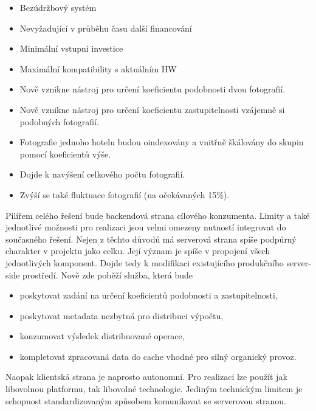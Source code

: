 \begin{itemize}
	\setlength{\parskip}{0pt}
	\setlength{\itemsep}{0pt}
	\item {Bezúdržbový systém}
	\item {Nevyžadující v průběhu času další financování}
	\item {Minimální vstupní investice}
	\item {Maximální kompatibility s aktuálním HW}
\end{itemize}

\begin{itemize}
	\setlength{\parskip}{0pt}
	\setlength{\itemsep}{0pt}
	\item {Nově vznikne nástroj pro určení koeficientu podobnosti dvou fotografií.}
	\item {Nově vznikne nástroj pro určení koeficientu zastupitelnosti vzájemně si podobných fotografií.}
	\item {Fotografie jednoho hotelu budou oindexovány a vnitřně škálovány do skupin pomocí koeficientů výše.}
	\item {Dojde k navýšení celkového počtu fotografií.}
	\item {Zvýší se také fluktuace fotografií (na očekávaných 15\%).}
\end{itemize}

Pilířem celého řešení bude backendová strana cílového konzumenta. Limity a také jednotlivé možnosti pro realizaci jsou velmi omezeny nutností integrovat do současného řešení. Nejen z těchto důvodů má serverová strana spíše podpůrný charakter v projektu jako celku. Její význam je spíše v propojení všech jednotlivých komponent. Dojde tedy k modifikaci existujícího produkčního server-side prostředí. Nově zde poběží služba, která bude
\begin{itemize}
	\setlength{\parskip}{0pt}
	\setlength{\itemsep}{0pt}
	\item {poskytovat zadání na určení koeficientů podobnosti a zastupitelnosti,}
	\item {poskytovat metadata nezbytná pro distribuci výpočtu,}
	\item {konzumovat výsledek distribuované operace,}
	\item {kompletovat zpracovaná data do cache vhodné pro silný organický provoz.}
\end{itemize}
Naopak klientská strana je naprosto autonomní. Pro realizaci lze použít jak libovolnou platformu, tak libovolné technologie. Jediným technickým limitem je schopnost standardizovaným způsobem komunikovat se serverovou stranou.

